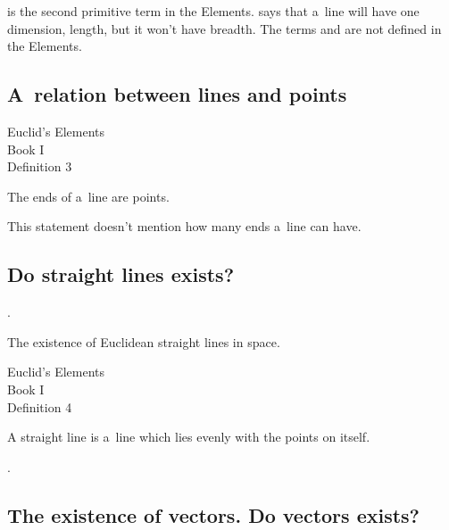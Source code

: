  is the second primitive term in the Elements.
 says that a~line will have one dimension, length, but it won’t have breadth.
The terms  and  are not defined in the Elements.

\subsection{A~relation between lines and points}

{\small
\setlength{\parindent}{0pt}

\begin{leftverticalbar}%

Euclid’s Elements\\
Book I\\
Definition 3

The ends of a~line are points.

\end{leftverticalbar}
\par}

This statement doesn’t mention how many ends a~line can have.

\subsection{Do straight lines exists?}

  .

The existence of
Euclidean straight lines
in space.

{\small
\setlength{\parindent}{0pt}

\begin{leftverticalbar}%

Euclid’s Elements\\
Book I\\
Definition 4

A straight line is a~line which lies evenly with the points on itself.

\end{leftverticalbar}
\par}

  .

\subsection{The existence of vectors. Do vectors exists?}

